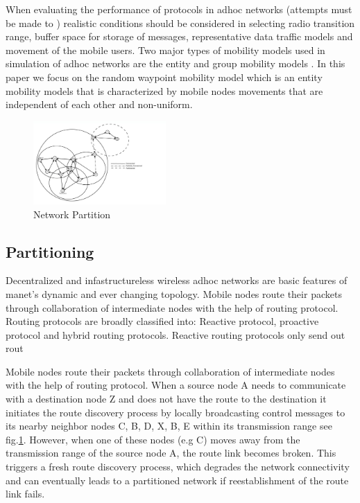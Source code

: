 \documentclass[letterpaper, 10 pt, conference]{ieeeconf}  %
\begin{document}
When evaluating the performance of protocols in adhoc networks (attempts must be made to ) realistic conditions should be considered in selecting radio transition range, buffer space for storage of messages, representative data traffic models and movement of the mobile users. Two major types of mobility models used in simulation of adhoc networks are the entity \cite{Camp2002AResearch} and group mobility models \cite{Hong1999ANetworks}. In this paper we focus on the random waypoint mobility model \cite{Navidi2004StationaryModel} which is an entity mobility models that is characterized by mobile nodes movements that are independent of each other and non-uniform.











\begin{figure}[H]
\includegraphics[width=0.45\textwidth]{partition1}
\caption{Network Partition}
\label{fig:partition1}
\end{figure}






\subsection{Partitioning}


Decentralized and infastructureless wireless adhoc networks are basic features of manet's dynamic and ever changing topology. Mobile nodes route their packets through collaboration of intermediate nodes with the help of routing protocol. Routing protocols are broadly classified into: Reactive protocol, proactive protocol and hybrid routing protocols. Reactive routing protocols only send out rout

Mobile nodes route their packets through collaboration of intermediate nodes with the help of routing protocol. When a source node A needs to communicate with a destination node Z and does not have the route to the destination it initiates the route discovery process by locally broadcasting control messages to its nearby neighbor nodes C, B, D, X, B, E  within its transmission range  see fig.\ref{fig:partition1}. However, when one of these nodes (e.g C) moves away from the transmission range of the source node A, the route link becomes broken. This triggers a fresh route discovery process, which degrades the network connectivity and can eventually leads to a partitioned network if reestablishment of the route link fails. 
\end{document}
